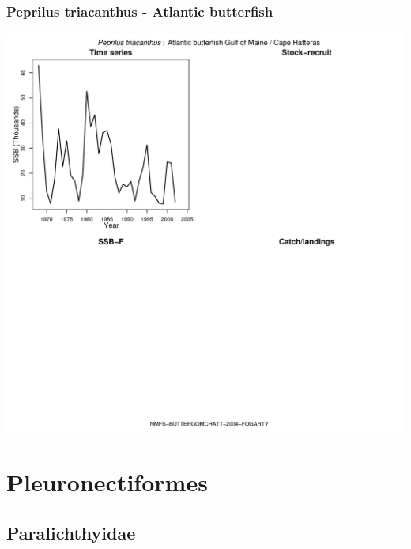 \subsubsection{Peprilus triacanthus - Atlantic butterfish}
\begin{center}
\includegraphics[width=1.2\textwidth]{../R/figures/NMFS-BUTTERGOMCHATT-2004-FOGARTY.pdf}
\end{center}

\section{Pleuronectiformes}

\subsection{Paralichthyidae}

